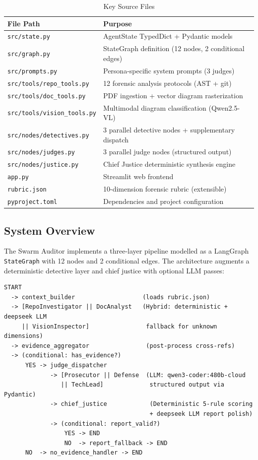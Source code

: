 \documentclass[11pt,a4paper]{article}
\begin{document}
\begin{table}[H]
\centering
\caption{Key Source Files}
\begin{tabular}{@{}ll@{}}
\toprule
\textbf{File Path} & \textbf{Purpose} \\
\midrule
\texttt{src/state.py}              & AgentState TypedDict + Pydantic models \\
\texttt{src/graph.py}              & StateGraph definition (12 nodes, 2 conditional edges) \\
\texttt{src/prompts.py}            & Persona-specific system prompts (3 judges) \\
\texttt{src/tools/repo\_tools.py}  & 12 forensic analysis protocols (AST + git) \\
\texttt{src/tools/doc\_tools.py}   & PDF ingestion + vector diagram rasterization \\
\texttt{src/tools/vision\_tools.py}& Multimodal diagram classification (Qwen2.5-VL) \\
\texttt{src/nodes/detectives.py}   & 3 parallel detective nodes + supplementary dispatch \\
\texttt{src/nodes/judges.py}       & 3 parallel judge nodes (structured output) \\
\texttt{src/nodes/justice.py}      & Chief Justice deterministic synthesis engine \\
\texttt{app.py}                    & Streamlit web frontend \\
\texttt{rubric.json}               & 10-dimension forensic rubric (extensible) \\
\texttt{pyproject.toml}            & Dependencies and project configuration \\
\bottomrule
\end{tabular}
\end{table}

\subsection{System Overview}

The Swarm Auditor implements a three-layer pipeline modelled as a LangGraph
\texttt{StateGraph} with 12 nodes and 2 conditional edges.  The architecture
augments a deterministic detective layer and chief justice with optional LLM passes:

\begin{lstlisting}[language={},title={Pipeline Flow}]
START
  -> context_builder                   (loads rubric.json)
  -> [RepoInvestigator || DocAnalyst   (Hybrid: deterministic + deepseek LLM
     || VisionInspector]                fallback for unknown dimensions)
  -> evidence_aggregator                (post-process cross-refs)
  -> (conditional: has_evidence?)
      YES -> judge_dispatcher
             -> [Prosecutor || Defense  (LLM: qwen3-coder:480b-cloud
                || TechLead]             structured output via Pydantic)
             -> chief_justice            (Deterministic 5-rule scoring
                                         + deepseek LLM report polish)
             -> (conditional: report_valid?)
                 YES -> END
                 NO  -> report_fallback -> END
      NO  -> no_evidence_handler -> END
\end{lstlisting}
\end{document}
